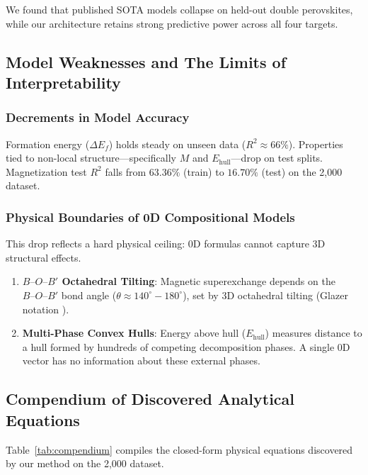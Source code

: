 \documentclass[12pt,onecolumn]{elsarticle}
\begin{document}
We found that published SOTA models collapse on held-out double perovskites, while our architecture retains strong predictive power across all four targets.

\subsection{Model Weaknesses and The Limits of Interpretability}

\subsubsection{Decrements in Model Accuracy}
Formation energy ($\Delta E_f$) holds steady on unseen data ($R^2 \approx 66\%$). Properties tied to non-local structure—specifically $M$ and $E_{\text{hull}}$—drop on test splits. Magnetization test $R^2$ falls from $63.36\%$ (train) to $16.70\%$ (test) on the 2,000 dataset.

\subsubsection{Physical Boundaries of 0D Compositional Models}
This drop reflects a hard physical ceiling: 0D formulas cannot capture 3D structural effects.
\begin{enumerate}
\item \textbf{$B\text{--}O\text{--}B'$ Octahedral Tilting}: Magnetic superexchange depends on the $B\text{--}O\text{--}B'$ bond angle ($\theta \approx 140^\circ - 180^\circ$), set by 3D octahedral tilting (Glazer notation \cite{woodward1997octahedral}).
\item \textbf{Multi-Phase Convex Hulls}: Energy above hull ($E_{\text{hull}}$) measures distance to a hull formed by hundreds of competing decomposition phases. A single 0D vector has no information about these external phases.
\end{enumerate}

\subsection{Compendium of Discovered Analytical Equations}
Table~\ref{tab:compendium} compiles the closed-form physical equations discovered by our method on the 2,000 dataset.
\end{document}
